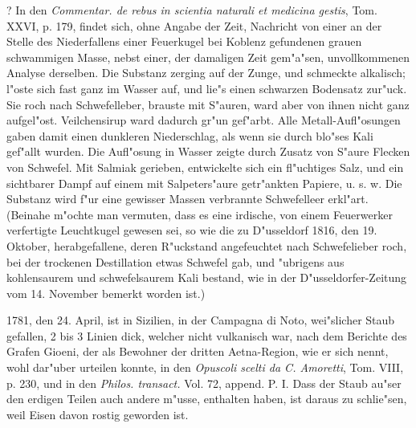 \documentclass[a4paper, 11pt, oneside, polutonikogreek, german]{article}
\begin{document}
? In den \emph{Commentar. de rebus in scientia naturali et medicina gestis}, Tom. XXVI, p. 179, findet sich, ohne Angabe der Zeit, Nachricht von einer an der Stelle des Niederfallens einer Feuerkugel bei Koblenz gefundenen grauen schwammigen Masse, nebst einer, der damaligen Zeit gem"a"sen, unvollkommenen Analyse derselben. Die Substanz zerging auf der Zunge, und schmeckte alkalisch; l"oste sich fast ganz im Wasser auf, und lie"s einen schwarzen Bodensatz zur"uck. Sie roch nach Schwefelleber, brauste mit S"auren, ward aber von ihnen nicht ganz aufgel"ost. Veilchensirup ward dadurch gr"un gef"arbt. Alle Metall-Aufl"osungen gaben damit einen dunkleren Niederschlag, als wenn sie durch blo"ses Kali gef"allt wurden. Die Aufl"osung in Wasser zeigte durch Zusatz von S"aure Flecken von Schwefel. Mit Salmiak gerieben, entwickelte sich ein fl"uchtiges Salz, und ein sichtbarer Dampf auf einem mit Salpeters"aure getr"ankten Papiere, u. s. w. Die Substanz wird f"ur eine gewisser Massen verbrannte Schwefelleer erkl"art. (Beinahe m"ochte man vermuten, dass es eine irdische, von einem Feuerwerker verfertigte Leuchtkugel gewesen sei, so wie die zu D"usseldorf 1816, den 19. Oktober, herabgefallene, deren R"uckstand angefeuchtet nach Schwefelieber roch, bei der trockenen Destillation etwas Schwefel gab, und "ubrigens aus kohlensaurem und schwefelsaurem Kali bestand, wie in der D"usseldorfer-Zeitung vom 14. November bemerkt worden ist.)

1781, den 24. April, ist in Sizilien, in der Campagna di Noto, wei"slicher Staub gefallen, 2 bis 3 Linien dick, welcher nicht vulkanisch war, nach dem Berichte des Grafen Gioeni, der als Bewohner der dritten Aetna-Region, wie er sich nennt, wohl dar"uber urteilen konnte, in den \emph{Opuscoli scelti da C. Amoretti}, Tom. VIII, p. 230, und in den \emph{Philos. transact.} Vol. 72, append. P. I. Dass der Staub au"ser den erdigen Teilen auch andere m"usse, enthalten haben, ist daraus zu schlie"sen, weil Eisen davon rostig geworden ist.
\end{document}
